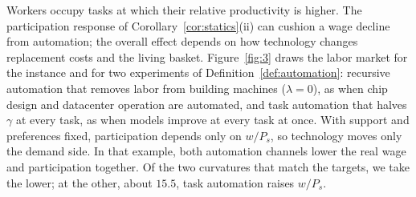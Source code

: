 \documentclass[12pt]{article}
\theoremstyle{plain}
\theoremstyle{definition}
\theoremstyle{remark}
\begin{document}
Workers occupy tasks at which their relative productivity is higher. The participation response of Corollary~\ref{cor:statics}(ii) can cushion a wage decline from automation; the overall effect depends on how technology changes replacement costs and the living basket.
Figure~\ref{fig:3} draws the labor market for the instance and for two experiments of Definition~\ref{def:automation}: recursive automation that removes labor from building machines ($\lambda=0$), as when chip design and datacenter operation are automated, and task automation that halves $\gamma$ at every task, as when models improve at every task at once.
With support and preferences fixed, participation depends only on $w/P_s$, so technology moves only the demand side. In that example, both automation channels lower the real wage and participation together.
Of the two curvatures that match the targets, we take the lower; at the other, about $15.5$, task automation raises $w/P_s$.
\end{document}
